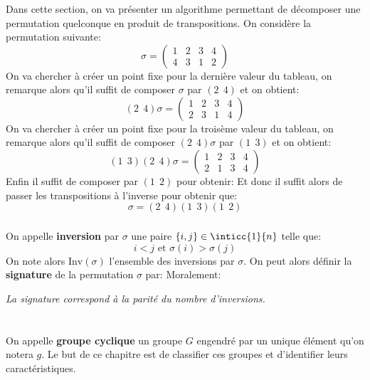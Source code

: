 \subsection*{}
Dans cette section, on va présenter un algorithme permettant de décomposer une permutation quelconque en produit de transpositions.\+
On considère la permutation suivante:
\[
   \sigma = \begin{pmatrix}
      1 & 2 & 3 & 4\\
      4 & 3 & 1 & 2
   \end{pmatrix}  
\]
On va chercher à créer un point fixe pour la dernière valeur du tableau, on remarque alors qu'il suffit de composer \(\sigma\) par \((2 \;\, 4)\) et on obtient:
\[
   (2 \;\, 4)\sigma = \begin{pmatrix}
      1 & 2 & 3 & 4\\
      2 & 3 & 1 & 4
   \end{pmatrix}  
\]
On va chercher à créer un point fixe pour la troisème valeur du tableau, on remarque alors qu'il suffit de composer \((2 \;\, 4)\sigma\) par \((1 \;\, 3)\) et on obtient:
\[
   (1 \;\, 3)(2 \;\, 4)\sigma = \begin{pmatrix}
      1 & 2 & 3 & 4\\
      2 & 1 & 3 & 4
   \end{pmatrix}  
\]
Enfin il suffit de composer par \((1 \;\, 2)\) pour obtenir:
Et donc il suffit alors de passer les transpositions à l'inverse pour obtenir que:
\[
   \sigma = (2 \;\, 4)(1 \;\, 3)(1 \;\, 2)
\]
\subsection*{}
On appelle \textbf{inversion} par \(\sigma\) une paire \(\{i, j\} \in \inticc{1}{n}\) telle que:
\[
   i < j \text{ et } \sigma(i) > \sigma(j)  
\] 
On note alors \(\text{Inv}(\sigma)\) l'ensemble des inversions par \(\sigma\). On peut alors définir la \textbf{signature} de la permutation \(\sigma\) par:
Moralement:
\begin{center}
   \textit{La signature correspond à la parité du nombre d'inversions.}
\end{center}
\chapter*{}
On appelle \textbf{groupe cyclique} un groupe \(G\) engendré par un unique élément qu'on notera \(g\). Le but de ce chapitre est de classifier ces groupes et d'identifier leurs caractéristiques.\<

